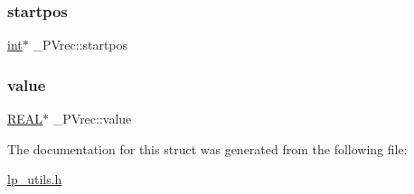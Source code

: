 \mbox{\label{struct___p_vrec_a437de6133a1365ae6d0164e5b8fe7d0c}} 
\subsubsection{\texorpdfstring{startpos}{startpos}}
{\footnotesize\ttfamily \hyperlink{lp__lib_8h_adeb9ec6400320e4923ac9d836d509ddb}{int}$\ast$ \+\_\+\+P\+Vrec\+::startpos}

\mbox{\label{struct___p_vrec_aa48f657bdfdfd166436b3f1869ed8ec1}} 
\subsubsection{\texorpdfstring{value}{value}}
{\footnotesize\ttfamily \hyperlink{lp__lib_8h_a92bd5e363d131fa73669358edb232dce}{R\+E\+AL}$\ast$ \+\_\+\+P\+Vrec\+::value}



The documentation for this struct was generated from the following file\+:\begin{DoxyCompactItemize}
\item 
\hyperlink{lp__utils_8h}{lp\+\_\+utils.\+h}\end{DoxyCompactItemize}
